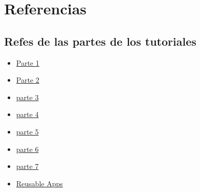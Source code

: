 \documentclass[10pt]{article}
\begin{document}



\newpage
\section{Referencias}
\subsection{Refes de las partes de los tutoriales}
\begin{itemize}
\item {\textcolor{B}{\href{https://docs.djangoproject.com/en/3.0/intro/tutorial01/}{Parte 1}}}

\item {\textcolor{B}{\href{https://docs.djangoproject.com/en/3.0/intro/tutorial02/}{Parte 2}}}

\item {\href{https://docs.djangoproject.com/en/3.0/intro/tutorial03/}{\textcolor{B}{parte 3}}}

\item {\href{https://docs.djangoproject.com/en/3.0/intro/tutorial04/}{\textcolor{B}{parte 4}}}

\item {\href{https://docs.djangoproject.com/en/3.0/intro/tutorial05/}{\textcolor{B}{parte 5}}}

\item {\href{https://docs.djangoproject.com/en/3.0/intro/tutorial06/}{\textcolor{B}{parte 6}}}

\item {\href{https://docs.djangoproject.com/en/3.0/intro/tutorial07/}{\textcolor{B}{parte 7}}}

\item {\href{https://docs.djangoproject.com/en/3.0/intro/reusable-apps/}{\textcolor{B}{Reusable Apps}}}
\end{itemize}
\end{document}
